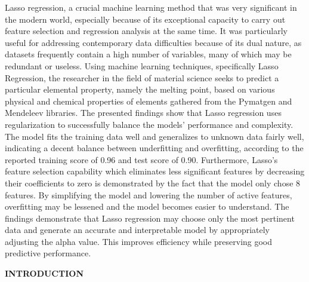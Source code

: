 \documentclass[12pt]{article}
\begin{document}
Lasso regression, a crucial machine learning method that was very significant in the modern world, especially because of its exceptional capacity to carry out feature selection and regression analysis at the same time. It was particularly useful for addressing contemporary data difficulties because of its dual nature, as datasets frequently contain a high number of variables, many of which may be redundant or useless. Using machine learning techniques, specifically Lasso Regression, the researcher in the field of material science seeks to predict a particular elemental property, namely the melting point, based on various physical and chemical properties of elements gathered from the Pymatgen and Mendeleev libraries. The presented findings show that Lasso regression uses regularization to successfully balance the models' performance and complexity. The model fits the training data well and generalizes to unknown data fairly well, indicating a decent balance between underfitting and overfitting, according to the reported training score of 0.96 and test score of 0.90. Furthermore, Lasso's feature selection capability which eliminates less significant features by decreasing their coefficients to zero is demonstrated by the fact that the model only chose 8 features. By simplifying the model and lowering the number of active features, overfitting may be lessened and the model becomes easier to understand. The findings demonstrate that Lasso regression may choose only the most pertinent data and generate an accurate and interpretable model by appropriately adjusting the alpha value. This improves efficiency while preserving good predictive performance.

\newpage
\begin{center}
\textbf{INTRODUCTION}
\end{center}
\end{document}

